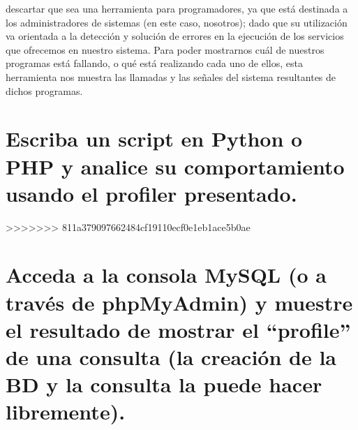 descartar que sea una herramienta para programadores, ya que está destinada a los administradores de sistemas (en este caso, nosotros); dado que su utilización va orientada a la detección y solución de errores en la ejecución de los servicios que ofrecemos en nuestro sistema. Para poder mostrarnos cuál de nuestros programas está fallando, o qué está realizando cada uno de ellos, esta herramienta nos muestra las llamadas y las señales del sistema resultantes de dichos programas.

\section{Escriba un script en Python o PHP y analice su comportamiento usando el profiler presentado.}
>>>>>>> 811a379097662484cf19110ecf0e1eb1ace5b0ae

\section{Acceda a la consola MySQL (o a través de phpMyAdmin) y muestre el resultado de mostrar el ``profile'' de una consulta (la creación de la BD y la consulta la puede hacer libremente).}





